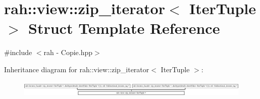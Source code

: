 \hypertarget{structrah_1_1view_1_1zip__iterator}{}\section{rah\+::view\+::zip\+\_\+iterator$<$ Iter\+Tuple $>$ Struct Template Reference}
\label{structrah_1_1view_1_1zip__iterator}


{\ttfamily \#include $<$rah -\/ Copie.\+hpp$>$}

Inheritance diagram for rah\+::view\+::zip\+\_\+iterator$<$ Iter\+Tuple $>$\+:\begin{figure}[H]
\begin{center}
\leavevmode
\includegraphics[height=0.781032cm]{structrah_1_1view_1_1zip__iterator}
\end{center}
\end{figure}
